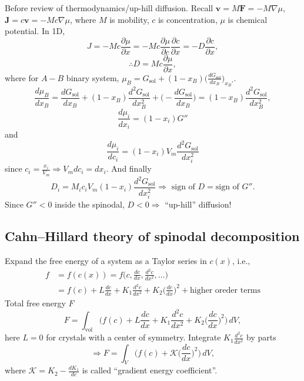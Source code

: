 \documentclass[12pt]{article}
\begin{document}
Before review of thermodynamics/up-hill diffusion.
Recall $\bm{v} = M \bm{F} = - M \nabla \mu$, $\bm{J} = c \bm{v} = - M c \nabla \mu$, where
$M$ is mobility, $c$ is concentration, $\mu$ is chemical potential.
In 1D,
\begin{equation*}
 J = - M c \frac{ \partial \mu }{ \partial x } = - M c \frac{ \partial \mu }{ \partial c } \frac{ \partial c }{ \partial x } = - D \frac{ \partial c }{ \partial x },
\end{equation*}
\begin{equation*}
 \therefore D = M c \frac{ \partial \mu }{ \partial x },
\end{equation*}
where for $A-B$ binary system, $\mu_B = G_{\text{sol}} + (1-x_B)
\Big( \frac{ dG_{\text{sol}} }{ dx_B } \Big)_{x_B'}$.
\begin{equation*}
 \frac{ d\mu_B }{ dx_B } = \frac{ dG_{\text{sol}} }{ dx_B } + (1-x_B)
 \frac{ d^2G_{\text{sol}} }{ dx_B^2 } +
 \Big( - \frac{ dG_{\text{sol}} }{ dx_B } \Big) =
 (1-x_B)
 \frac{ d^2G_{\text{sol}} }{ dx_B^2 },
\end{equation*}
\begin{equation*}
 \frac{ d\mu_i }{ dx_i } = (1-x_i) G''
\end{equation*}
and
\begin{equation*}
 \frac{ d\mu_i }{ dc_i } = (1-x_i) V_m \frac{ d^2G_{\text{sol}} }{ dx_i^2 }
\end{equation*}
since $c_i = \frac{ x_i }{ V_m } \Rightarrow V_m dc_i = dx_i$.
And finally
\begin{equation*}
 D_i = M_i c_i V_m (1-x_i) \frac{ d^2G_{\text{sol}} }{ dx_i^2 } \Rightarrow
 {\text{ sign of }} D = {\text{sign of }} G''.
\end{equation*}
Since $G'' < 0$ inside the spinodal, $D < 0 \Rightarrow $ ``up-hill'' diffusion!

\subsection*{Cahn--Hillard theory of spinodal decomposition}
Expand the free energy of a system as a Taylor series in $c(x)$,
i.e.,
\begin{align*}
 f & = f(c(x)) = f\Big( c, \frac{ dc }{ dx }, \frac{ d^2 c }{ dx^2 }, \ldots \Big) \\
   & = f(c) + L \frac{ dc }{ dx } + K_1 \frac{ d^2 c }{ dx^2 } + K_2 \Big(
 \frac{ dc }{ dx } \Big)^2 + {\text{higher oreder terms}}
\end{align*}
Total free energy $F$
\begin{equation*}
 F = \int_{\text{vol}} \bigg(
 f(c) + L \frac{ dc }{ dx } + K_1 \frac{ d^2 c }{ dx^2 } + K_2 \Big(
 \frac{ dc }{ dx } \Big)^2 \bigg) \, dV,
\end{equation*}
here $L = 0$ for crystals with a center of symmetry.
Integrate $K_1 \frac{ d^2 c }{ dx^2 }$ by parts
\begin{equation*}
 \Rightarrow F = \int_V \bigg(
 f(c) + \mathcal{K} \Big( \frac{ dc }{ dx } \Big)^2
 \bigg) \, dV,
\end{equation*}
where $\mathcal{K} = K_2 - \frac{ dK_1 }{ dc }$ is called ``gradient energy
coefficient''.
\end{document}
